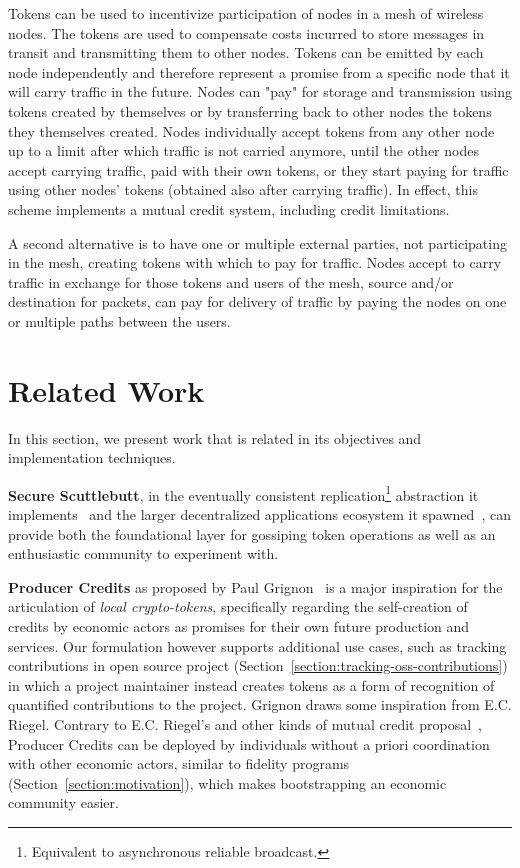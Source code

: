 \documentclass[sigplan,screen,10pt,review,anonymous]{acmart}
\begin{document}
Tokens can be used to incentivize participation of nodes in a mesh of wireless nodes. The tokens are used to compensate  costs incurred to store messages in transit and transmitting them to other nodes. Tokens can be emitted by each node independently and therefore represent a promise from a specific node that it will carry traffic in the future. Nodes can "pay" for storage and transmission using tokens created by themselves or by transferring back to other nodes the tokens they themselves created. Nodes individually accept tokens from any other node up to a limit after which traffic is not carried anymore, until the other nodes accept carrying traffic, paid with their own tokens, or they start paying for traffic using other nodes' tokens (obtained also after carrying traffic). In effect, this scheme implements a mutual credit system, including credit limitations.

A second alternative is to have one or multiple external parties, not participating in the mesh, creating tokens with which to pay for traffic. Nodes accept to carry traffic in exchange for those tokens and users of the mesh, source and/or destination for packets, can pay for delivery of traffic by paying the nodes on one or multiple paths between the users.

\section{Related Work}
\label{section:related-work}

In this section, we present work that is related in its objectives and implementation techniques.

\textbf{Secure Scuttlebutt}, in the eventually consistent replication\footnote{Equivalent to asynchronous reliable broadcast.} abstraction it implements~\cite{kermarrec2020gossiping} and the larger decentralized applications ecosystem it spawned~\cite{tarr2019ssb}, can provide both the foundational layer for gossiping token operations as well as an enthusiastic community to experiment with.

\textbf{Producer Credits} as proposed by Paul Grignon~\cite{producercredit} is a major inspiration for the articulation of \textit{local crypto-tokens}, specifically regarding the self-creation of credits by economic actors as promises for their own future production and services. Our formulation however supports additional use cases, such as tracking contributions in open source project (Section~\ref{section:tracking-oss-contributions}) in which a project maintainer instead creates tokens as a form of recognition of quantified contributions to the project. Grignon draws some inspiration from E.C. Riegel. Contrary to E.C. Riegel's and other kinds of mutual credit proposal~\cite{mutualcredit}, Producer Credits can be deployed by individuals without a priori coordination with other economic actors, similar to fidelity programs (Section~\ref{section:motivation}), which makes bootstrapping an economic community easier.
\end{document}
